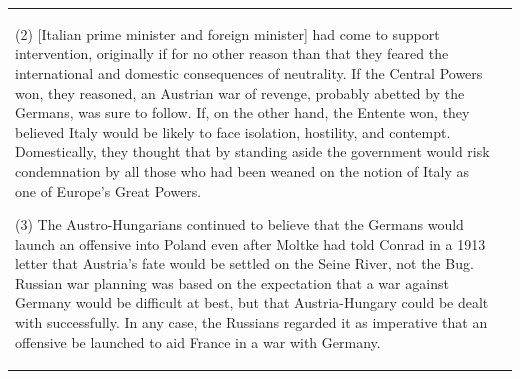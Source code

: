 {\begin{longtable}{p{}p{}}
(2) [Italian prime minister and foreign minister] had come to support intervention, originally if for no other reason than that they feared the international and domestic consequences of neutrality. If the Central Powers won, they reasoned, an Austrian war of revenge, probably abetted by the Germans, was sure to follow. If, on the other hand, the Entente won, they believed Italy would be likely to face isolation, hostility, and contempt. Domestically, they thought that by standing aside the government would risk condemnation by all those who had been weaned on the notion of Italy as one of Europe's Great Powers.

(3) The Austro-Hungarians continued to believe that the Germans would launch an offensive into Poland even after Moltke had told Conrad in a 1913 letter that Austria's fate would be settled on the Seine River, not the Bug. Russian war planning was based on the expectation that a war against Germany would be difficult at best, but that Austria-Hungary could be dealt with successfully. In any case, the Russians regarded it as imperative that an offensive be launched to aid France in a war with Germany.


\end{longtable}}
